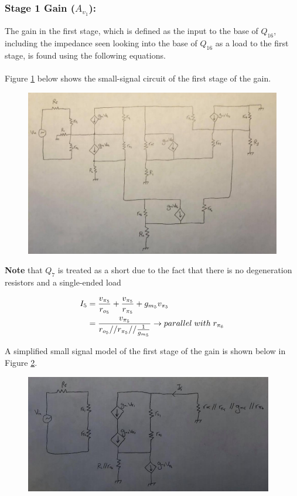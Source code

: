 \documentclass{article}
\begin{document}
	\subsubsection*{Stage 1 Gain ($A_{v_1}$):}
	The gain in the first stage, which is defined as the input to the base of $Q_{16}$, including the impedance seen looking into the base of $Q_{16}$ as a load to the first stage, is found using the following equations.\\\\
	Figure \ref{f:2} below shows the small-signal circuit of the first stage of the gain.
	\begin{figure}[!ht]
		\centering
		\includegraphics[width=0.7\textheight]{ssm_gain1.png}
		\label{f:2}
	\end{figure}
	
	\noindent\textbf{Note} that $Q_7$ is treated as a short due to the fact that there is no degeneration resistors and a single-ended load
	
	\begin{align*}
		I_5 &= \frac{v_{\pi_{5}}}{r_{o_5}} + \frac{v_{\pi_{5}}}{r_{\pi_5}} + g_{m_5} v_{\pi_{5}}\\
		&= \frac{v_{\pi_5}}{r_{o_5} // r_{\pi_{5}} // \frac{1}{g_{m_5}}} \rightarrow parallel \hspace{1mm} with \hspace{1mm} r_{\pi_{6}}
	\end{align*}
	
	\pagebreak
	A simplified small signal model of the first stage of the gain is shown below in Figure \ref{f:3}.
	\begin{figure}[!ht]
		\centering
		\includegraphics[width=0.7\textheight]{ssm_gain1_simplified.png}
		\label{f:3}
	\end{figure}
	
\end{document}
